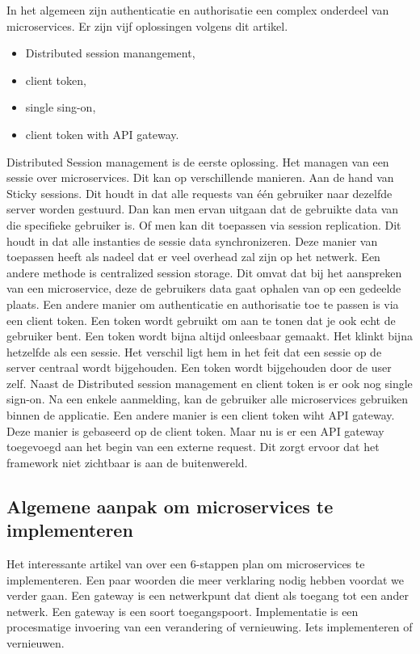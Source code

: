 In het algemeen zijn authenticatie en authorisatie een complex onderdeel van microservices.
Er zijn vijf oplossingen volgens dit artikel.
\begin{itemize}
	\item Distributed session manangement,
	\item client token,
	\item single sing-on, 
	\item client token with API gateway.
\end{itemize}
Distributed Session management is de eerste oplossing. Het managen van een sessie over microservices. Dit kan op verschillende manieren. Aan de hand van Sticky sessions. Dit houdt in dat alle requests van één gebruiker naar dezelfde server worden gestuurd. Dan kan men ervan uitgaan dat de gebruikte data van die specifieke gebruiker is. Of men kan dit toepassen via session replication. Dit houdt in dat alle instanties de sessie data synchronizeren. Deze manier van toepassen heeft als nadeel dat er veel overhead zal zijn op het netwerk. Een andere methode is centralized session storage. Dit omvat dat bij het aanspreken van een microservice, deze de gebruikers data gaat ophalen van op een gedeelde plaats. 
Een andere manier om authenticatie en authorisatie toe te passen is via een client token. Een token wordt gebruikt om aan te tonen dat je ook echt de gebruiker bent. Een token wordt bijna altijd onleesbaar gemaakt. Het klinkt bijna hetzelfde als een sessie. Het verschil ligt hem in het feit dat een sessie op de server centraal wordt bijgehouden. Een token wordt bijgehouden door de user zelf.
Naast de Distributed session management en client token is er ook nog single sign-on. Na een enkele aanmelding, kan de gebruiker alle microservices gebruiken binnen de applicatie. 
Een andere manier is een client token wiht API gateway. Deze manier is gebaseerd op de client token. Maar nu is er een API gateway toegevoegd aan het begin van een externe request. Dit zorgt ervoor dat het framework niet zichtbaar is aan de buitenwereld. 
\subsection{Algemene aanpak om microservices te implementeren}
Het interessante artikel van \textcite{Benetis2016} over een 6-stappen plan om microservices te implementeren. Een paar woorden die meer verklaring nodig hebben voordat we verder gaan. Een gateway is een netwerkpunt dat dient als toegang tot een ander netwerk. Een gateway is een soort toegangspoort. Implementatie is een procesmatige invoering van een verandering of vernieuwing. Iets implementeren of vernieuwen. 

